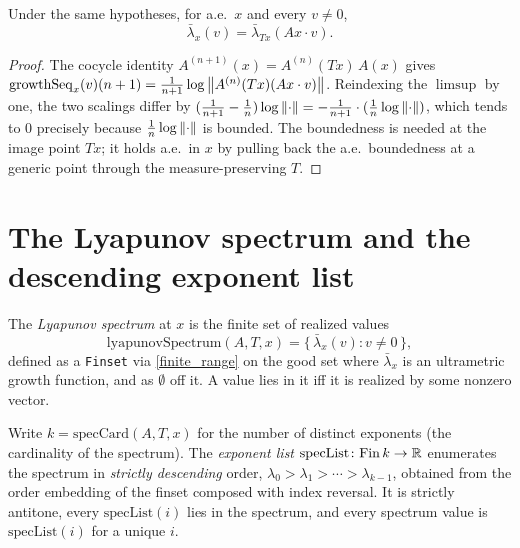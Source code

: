 \begin{theorem}[$A$-equivariance, a.e.]\label{lambdaBar_equivariant_ae}
  \leanok
  Under the same hypotheses, for a.e.\ $x$ and every $v\neq 0$,
  \[ \bar\lambda_x(v) = \bar\lambda_{Tx}(A x\cdot v). \]
  \begin{proof}\leanok
  The cocycle identity $A^{(n+1)}(x)=A^{(n)}(Tx)\,A(x)$ gives
  $\mathrm{growthSeq}_x(v)(n+1)=\tfrac1{n+1}\log\left\lVert A^{(n)}(Tx)(A x\cdot v) \right\rVert$.
  Reindexing the $\limsup$ by one, the two scalings differ by
  $(\tfrac1{n+1}-\tfrac1n)\log\left\lVert \cdot \right\rVert=-\tfrac1{n+1}\cdot(\tfrac1n\log\left\lVert \cdot \right\rVert)$,
  which tends to $0$ precisely because $\tfrac1n\log\left\lVert \cdot \right\rVert$ is bounded. The
  boundedness is needed at the image point $Tx$; it holds a.e.\ in $x$ by pulling
  back the a.e.\ boundedness at a generic point through the measure-preserving $T$.
  \end{proof}
\end{theorem}

\section{The Lyapunov spectrum and the descending exponent list}

\begin{definition}\label{lyapunovSpectrum}
  \leanok
  The \emph{Lyapunov spectrum} at $x$ is the finite set of realized values
  \[ \mathrm{lyapunovSpectrum}(A,T,x)
     = \{\,\bar\lambda_x(v) : v\neq 0\,\}, \]
  defined as a \texttt{Finset} via \ref{finite_range} on the good set where
  $\bar\lambda_x$ is an ultrametric growth function, and as $\emptyset$ off it.
  A value lies in it iff it is realized by some nonzero vector.
\end{definition}

\begin{definition}\label{specList}
  \leanok
  Write $k=\mathrm{specCard}(A,T,x)$ for the number of distinct exponents (the
  cardinality of the spectrum). The \emph{exponent list}
  $\mathrm{specList}\colon \mathrm{Fin}\,k\to\mathbb{R}$ enumerates the spectrum in
  \emph{strictly descending} order, $\lambda_0>\lambda_1>\cdots>\lambda_{k-1}$,
  obtained from the order embedding of the finset composed with index reversal.
  It is strictly antitone, every $\mathrm{specList}(i)$ lies in the spectrum, and
  every spectrum value is $\mathrm{specList}(i)$ for a unique $i$.
\end{definition}

